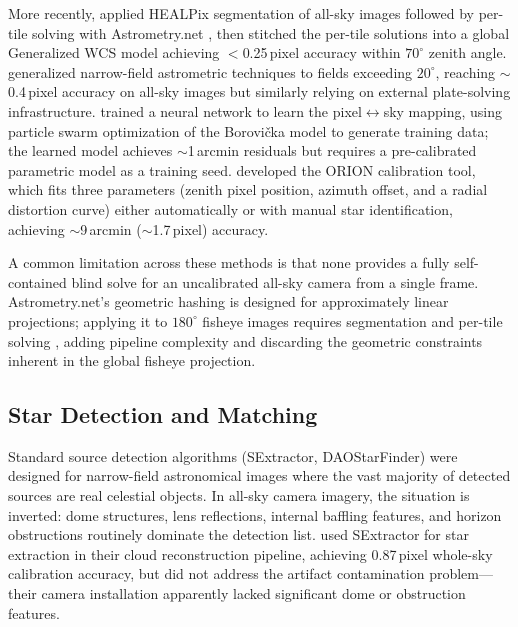 More recently, \citet{yin_ali_2025} applied HEALPix segmentation of
all-sky images followed by per-tile solving with Astrometry.net
\citep{lang_astrometrynet_2010}, then stitched the per-tile solutions into
a global Generalized WCS model achieving $<$0.25\,pixel accuracy within
$70^\circ$ zenith angle.  \citet{yang_astrometry_2025} generalized
narrow-field astrometric techniques to fields exceeding $20^\circ$,
reaching $\sim$0.4\,pixel accuracy on all-sky images but similarly relying
on external plate-solving infrastructure.  \citet{tian_astrometric_2022}
trained a neural network to learn the pixel$\leftrightarrow$sky mapping,
using particle swarm optimization of the Borovi\v{c}ka model to generate
training data; the learned model achieves $\sim$1\,arcmin residuals but
requires a pre-calibrated parametric model as a training seed.
\citet{antuna-sanchez_orion_2022} developed the ORION calibration tool,
which fits three parameters (zenith pixel position, azimuth offset, and a
radial distortion curve) either automatically or with manual star
identification, achieving $\sim$9\,arcmin ($\sim$1.7\,pixel) accuracy.

A common limitation across these methods is that none provides a
fully self-contained blind solve for an uncalibrated all-sky camera from a
single frame.  Astrometry.net's geometric hashing
\citep{lang_astrometrynet_2010} is designed for approximately linear
projections; applying it to $180^\circ$ fisheye images requires
segmentation and per-tile solving \citep{yin_ali_2025}, adding pipeline
complexity and discarding the geometric constraints inherent in the global
fisheye projection.

\subsection{Star Detection and Matching}
\label{sec:litreview:detection}

Standard source detection algorithms (SExtractor, DAOStarFinder) were
designed for narrow-field astronomical images where the vast majority of
detected sources are real celestial objects.  In all-sky camera imagery,
the situation is inverted: dome structures, lens reflections, internal
baffling features, and horizon obstructions routinely dominate the
detection list.  \citet{zhi_cloud_2024} used SExtractor for star
extraction in their cloud reconstruction pipeline, achieving 0.87\,pixel
whole-sky calibration accuracy, but did not address the artifact
contamination problem---their camera installation apparently lacked
significant dome or obstruction features.

